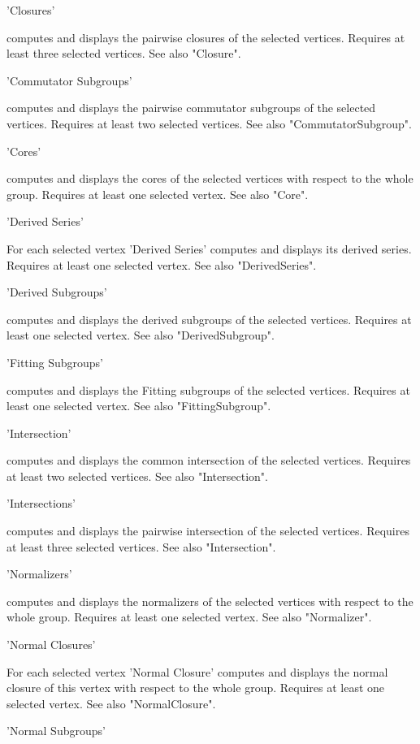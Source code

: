 'Closures'

computes  and  displays the pairwise  closures of  the selected vertices.
Requires at least three selected vertices. See also "Closure".

'Commutator Subgroups'

computes and displays  the pairwise commutator  subgroups of the selected
vertices.    Requires  at  least    two   selected  vertices. See    also
"CommutatorSubgroup".

'Cores'

computes and displays the cores of  the selected vertices with respect to
the whole group.  Requires at least one selected vertex. See also "Core".

'Derived Series'

For   each  selected vertex  'Derived  Series'  computes and displays its
derived series.   Requires  at   least  one selected vertex.    See  also
"DerivedSeries".

'Derived Subgroups'

computes and  displays the  derived  subgroups of the selected  vertices.
Requires at least one selected vertex.  See also "DerivedSubgroup".

'Fitting Subgroups'

computes and   displays   the   Fitting   subgroups   of   the   selected
vertices.  Requires    at   least one      selected  vertex.   See   also
"FittingSubgroup".

'Intersection'

computes and  displays the common intersection  of the selected vertices.
Requires at least two selected vertices.  See also "Intersection".

'Intersections'

computes and displays the pairwise intersection of the selected vertices.
Requires at least three selected vertices.  See also "Intersection".

'Normalizers'

computes   and displays  the normalizers   of  the selected vertices with
respect to the whole group.  Requires at least  one selected vertex.  See
also "Normalizer".

'Normal Closures'

For   each  selected vertex 'Normal  Closure'  computes  and displays the
normal closure of this vertex with respect  to the whole group.  Requires
at least one selected vertex.  See also "NormalClosure".

'Normal Subgroups'

